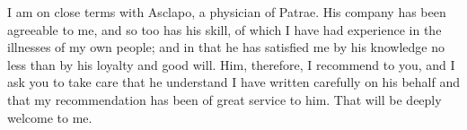 

I am on close terms with Asclapo, a physician of Patrae. His company has been agreeable to me, and so too has his skill, of which I have had experience in the illnesses of my own people; and in that he has satisfied me by his knowledge no less than by his loyalty and good will. Him, therefore, I recommend to you, and I ask you to take care that he understand I have written carefully on his behalf and that my recommendation has been of great service to him. That will be deeply welcome to me.
